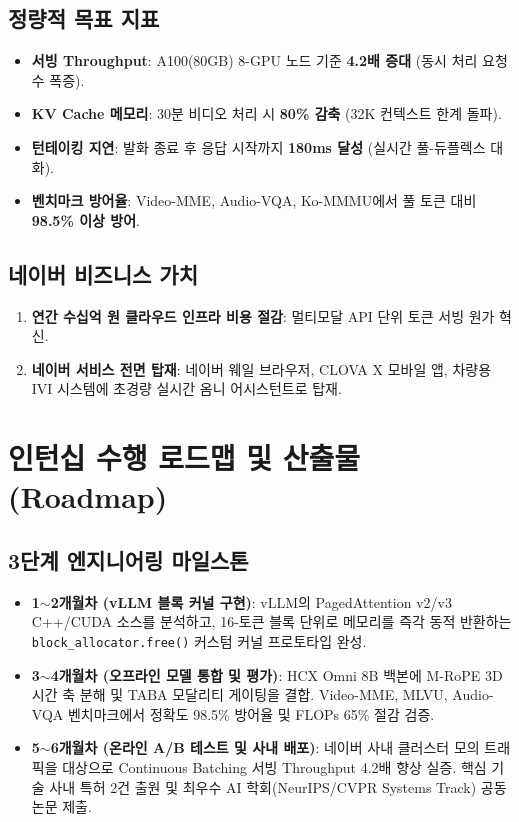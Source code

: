 \documentclass[10pt, a4paper, twocolumn]{article}
\begin{document}
\subsection{정량적 목표 지표}
\begin{itemize}
    \item \textbf{서빙 Throughput}: A100(80GB) 8-GPU 노드 기준 \textbf{4.2배 증대} (동시 처리 요청 수 폭증).
    \item \textbf{KV Cache 메모리}: 30분 비디오 처리 시 \textbf{80\% 감축} (32K 컨텍스트 한계 돌파).
    \item \textbf{턴테이킹 지연}: 발화 종료 후 응답 시작까지 \textbf{180ms 달성} (실시간 풀-듀플렉스 대화).
    \item \textbf{벤치마크 방어율}: Video-MME, Audio-VQA, Ko-MMMU에서 풀 토큰 대비 \textbf{98.5\% 이상 방어}.
\end{itemize}

\subsection{네이버 비즈니스 가치}
\begin{enumerate}
    \item \textbf{연간 수십억 원 클라우드 인프라 비용 절감}: 멀티모달 API 단위 토큰 서빙 원가 혁신.
    \item \textbf{네이버 서비스 전면 탑재}: 네이버 웨일 브라우저, CLOVA X 모바일 앱, 차량용 IVI 시스템에 초경량 실시간 옴니 어시스턴트로 탑재.
\end{enumerate}

\section{인턴십 수행 로드맵 및 산출물 (Roadmap)}

\subsection{3단계 엔지니어링 마일스톤}
\begin{itemize}
    \item \textbf{1$\sim$2개월차 (vLLM 블록 커널 구현)}: vLLM의 PagedAttention v2/v3 C++/CUDA 소스를 분석하고, 16-토큰 블록 단위로 메모리를 즉각 동적 반환하는 \texttt{block\_allocator.free()} 커스텀 커널 프로토타입 완성.
    \item \textbf{3$\sim$4개월차 (오프라인 모델 통합 및 평가)}: HCX Omni 8B 백본에 M-RoPE 3D 시간 축 분해 및 TABA 모달리티 게이팅을 결합. Video-MME, MLVU, Audio-VQA 벤치마크에서 정확도 98.5\% 방어율 및 FLOPs 65\% 절감 검증.
    \item \textbf{5$\sim$6개월차 (온라인 A/B 테스트 및 사내 배포)}: 네이버 사내 클러스터 모의 트래픽을 대상으로 Continuous Batching 서빙 Throughput 4.2배 향상 실증. 핵심 기술 사내 특허 2건 출원 및 최우수 AI 학회(NeurIPS/CVPR Systems Track) 공동 논문 제출.
\end{itemize}
\end{document}
